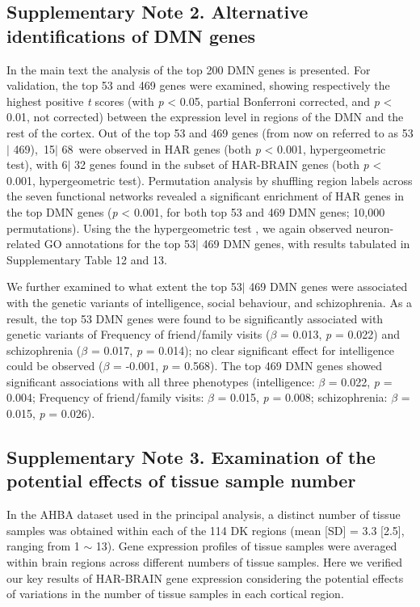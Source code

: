 \begin{refsection}
\subsection*{Supplementary Note 2. Alternative identifications of DMN genes}
In the main text the analysis of the top 200 DMN genes is presented. For validation, the top 53 and 469 genes were examined, showing respectively the highest positive \textit{t} scores (with \textit{p} < 0.05, partial Bonferroni corrected, and \textit{p} < 0.01, not corrected) between the expression level in regions of the DMN and the rest of the cortex. Out of the top 53 and 469 genes (from now on referred to as 53$ \vert $ 469), 15$ \vert $ 68 were observed in HAR genes (both \textit{p} < 0.001, hypergeometric test), with 6$ \vert $ 32 genes found in the subset of HAR-BRAIN genes (both \textit{p} < 0.001, hypergeometric test). Permutation analysis by shuffling region labels across the seven functional networks revealed a significant enrichment of HAR genes in the top DMN genes (\textit{p} < 0.001, for both top 53 and 469 DMN genes; 10,000 permutations). Using the the hypergeometric test \citep{watanabe2017functional}, we again observed neuron-related GO annotations for the top 53$ \vert $ 469 DMN genes, with results tabulated in Supplementary Table 12 and 13.

We further examined to what extent the top 53$ \vert $ 469 DMN genes were associated with the genetic variants of intelligence, social behaviour, and schizophrenia. As a result, the top 53 DMN genes were found to be significantly associated with genetic variants of Frequency of friend/family visits (\textit{$ \beta $  }= 0.013, \textit{p} = 0.022) and schizophrenia (\textit{$ \beta $  }= 0.017, \textit{p} = 0.014); no clear significant effect for intelligence could be observed (\textit{$ \beta $  }= -0.001, \textit{p} = 0.568). The top 469 DMN genes showed significant associations with all three phenotypes (intelligence: \textit{$ \beta $  }= 0.022, \textit{p} = 0.004; Frequency of friend/family visits: \textit{$ \beta $  }= 0.015, \textit{p} = 0.008; schizophrenia: \textit{$ \beta $  }= 0.015, \textit{p} = 0.026).

\subsection*{Supplementary Note 3. Examination of the potential effects of tissue sample number}
In the AHBA dataset used in the principal analysis, a distinct number of tissue samples was obtained within each of the 114 DK regions (mean [SD] = 3.3 [2.5], ranging from 1 $ \sim $  13). Gene expression profiles of tissue samples were averaged within brain regions across different numbers of tissue samples. Here we verified our key results of HAR-BRAIN gene expression considering the potential effects of variations in the number of tissue samples in each cortical region.


\end{refsection}

